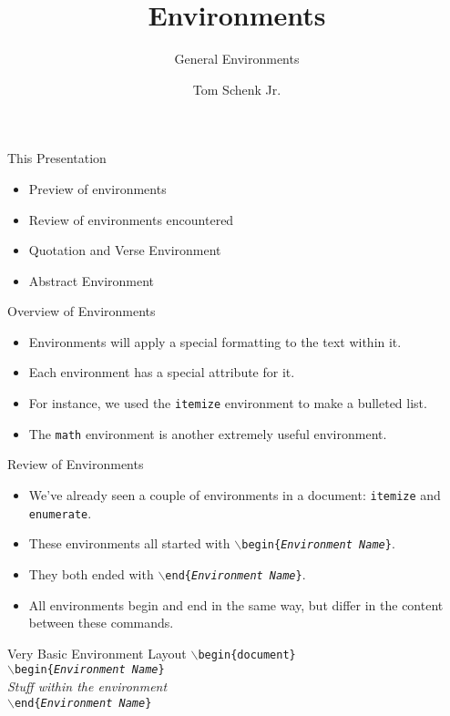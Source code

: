 \documentclass[pdf]{prosper}
\title{Environments}
\subtitle{General Environments}
\author{Tom Schenk Jr.}		%
\begin{document}
\maketitle
\begin{slide}{This Presentation}
	\begin{itemize}
		\item Preview of environments
		\item Review of environments encountered
		\item Quotation and Verse Environment
		\item Abstract Environment
	\end{itemize}
\end{slide}
\begin{slide}{Overview of Environments}
	\begin{itemize}
		\item Environments will apply a special formatting to the text within it.
		\item Each environment has a special attribute for it.
		\item For instance, we used the \texttt{itemize} environment to make a bulleted list.
		\item The \texttt{math} environment is another extremely useful environment.
	\end{itemize}
\end{slide}
\begin{slide}{Review of Environments}
	\begin{itemize}
		\item We've already seen a couple of environments in a document: \texttt{itemize} and \texttt{enumerate}.
		\item These environments all started with \texttt{$\backslash$begin\{\textit{Environment Name}\}}.
		\item They both ended with \texttt{$\backslash$end\{\textit{Environment Name}\}}.
		\item All environments begin and end in the same way, but differ in the content between these commands.
	\end{itemize}
\end{slide}
\begin{slide}{Very Basic Environment Layout}
	\texttt{$\backslash$begin\{document\}} \\
	\texttt{$\backslash$begin\{\textit{Environment Name}\}} \\
	\textit{Stuff within the environment} \\
	\texttt{$\backslash$end\{\textit{Environment Name}\}} \\
\end{slide}
\end{document}
